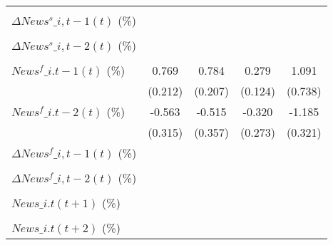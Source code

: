 {\begin{tabular}{l*{4}{c}}
                    &                     &                     &                     &                     \\
\addlinespace
$ \Delta News^s\_{i,t-1}(t)$ (\%)&                     &                     &                     &                     \\
                    &                     &                     &                     &                     \\
\addlinespace
$ \Delta News^s\_{i,t-2}(t)$ (\%)&                     &                     &                     &                     \\
                    &                     &                     &                     &                     \\
\addlinespace
$ News^f\_{i.t-1}(t)$ (\%)&       0.769\sym{***}&       0.784\sym{***}&       0.279\sym{**} &       1.091         \\
                    &     (0.212)         &     (0.207)         &     (0.124)         &     (0.738)         \\
\addlinespace
$ News^f\_{i.t-2}(t)$ (\%)&      -0.563\sym{*}  &      -0.515         &      -0.320         &      -1.185\sym{***}\\
                    &     (0.315)         &     (0.357)         &     (0.273)         &     (0.321)         \\
\addlinespace
$ \Delta News^f\_{i,t-1}(t)$ (\%)&                     &                     &                     &                     \\
                    &                     &                     &                     &                     \\
\addlinespace
$ \Delta News^f\_{i,t-2}(t)$ (\%)&                     &                     &                     &                     \\
                    &                     &                     &                     &                     \\
\addlinespace
$ News\_{i.t}(t+1)$ (\%)&                     &                     &                     &                     \\
                    &                     &                     &                     &                     \\
\addlinespace
$ News\_{i.t}(t+2)$ (\%)&                     &                     &                     &                     \\

\end{tabular}}
